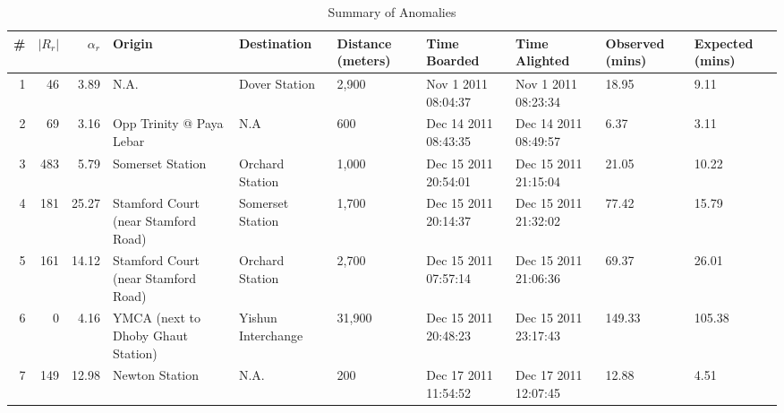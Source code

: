 \documentclass[conference]{IEEEtran.1.8}
\begin{document}
\begin{table}[htb]
	\centering
	\caption{Summary of Anomalies}
	\label{tbl:anomalies}
	\begin{tabular}{|r|r|r|p{2.3cm}|p{2.3cm}|p{1.2cm}|p{1.6cm}|p{1.6cm}|p{1.4cm}|p{1.4cm}|}
		\hline
		\# & $|R_r|$ & $\alpha_r$ & Origin & Destination & Distance (meters) & Time Boarded & Time Alighted & Observed (mins) & Expected (mins) \\
		\hline
		1 & 46 & 3.89 & N.A. & Dover Station & 2,900 & Nov 1 2011 08:04:37 & Nov 1 2011 08:23:34 & 18.95 & 9.11 \\
		\hline
		2 & 69 & 3.16 & Opp Trinity @ Paya Lebar & N.A & 600 & Dec 14 2011 08:43:35 & Dec 14 2011 08:49:57 &6.37 & 3.11\\
		\hline
		3 & 483 & 5.79 & Somerset Station & Orchard Station & 1,000 & Dec 15 2011 20:54:01 & Dec 15 2011 21:15:04 & 21.05 & 10.22 \\
		\hline
		4 & 181 & 25.27 & Stamford Court (near Stamford Road) & Somerset Station & 1,700 & Dec 15 2011 20:14:37 & Dec 15 2011 21:32:02 & 77.42 & 15.79 \\
		\hline
		5 & 161 & 14.12 & Stamford Court (near Stamford Road) & Orchard Station & 2,700 & Dec 15 2011 07:57:14 & Dec 15 2011 21:06:36 & 69.37 & 26.01 \\
		\hline
		6 & 0 & 4.16 & YMCA (next to Dhoby Ghaut Station) & Yishun Interchange & 31,900 & Dec 15 2011 20:48:23 & Dec 15 2011 23:17:43 & 149.33 & 105.38 \\
		\hline
		7 & 149 & 12.98 & Newton Station & N.A. & 200 & Dec 17 2011 11:54:52 & Dec 17 2011 12:07:45 & 12.88 & 4.51 \\
		\hline
	\end{tabular}
\end{table}
\end{document}
